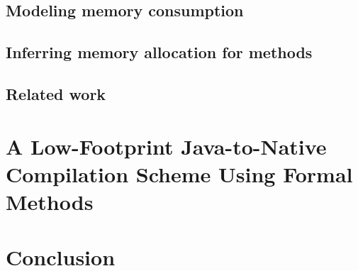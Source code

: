 \documentclass[book,10pt]{book}
\begin{document}
  \section{Modeling memory consumption}\label{sec:verif}
  
  
  \section{Inferring memory allocation for methods}\label{sec:infer}
  \label{sec:infer}
  \section{Related work}\label{sec:rel}
  

\chapter{A Low-Footprint Java-to-Native Compilation Scheme Using Formal Methods}\label{applications:optimComp}
  \lstset{frameround=tttt}
  
  
  
  
  
  
   
   
  
 

\chapter{Conclusion}

\appendix
    
    
    
 


\end{document}
